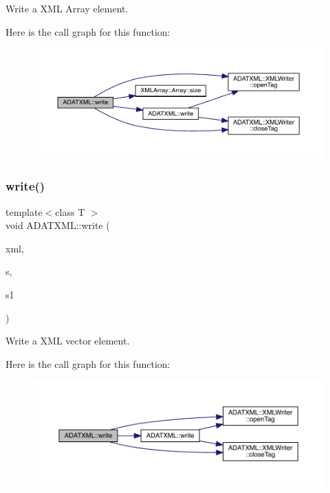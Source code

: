 Write a X\+ML Array element. 

Here is the call graph for this function\+:\nopagebreak
\begin{figure}[H]
\begin{center}
\leavevmode
\includegraphics[width=350pt]{d2/da3/group__io_ga505002df14eea0ecd6a4c92bfdc6425d_cgraph}
\end{center}
\end{figure}
\mbox{\label{group__io_gad6746caf2a4ff29e3ae8da748fd880a7}} 
\subsubsection{\texorpdfstring{write()}{write()}\hspace{0.1cm}{\footnotesize\ttfamily [16/58]}}
{\footnotesize\ttfamily template$<$class T $>$ \\
void A\+D\+A\+T\+X\+M\+L\+::write (\begin{DoxyParamCaption}\item[{\mbox{\hyperlink{classADATXML_1_1XMLWriter}{X\+M\+L\+Writer}} \&}]{xml,  }\item[{const std\+::string \&}]{s,  }\item[{const std\+::vector$<$ T $>$ \&}]{s1 }\end{DoxyParamCaption})\hspace{0.3cm}{\ttfamily [inline]}}



Write a X\+ML vector element. 

Here is the call graph for this function\+:\nopagebreak
\begin{figure}[H]
\begin{center}
\leavevmode
\includegraphics[width=350pt]{d2/da3/group__io_gad6746caf2a4ff29e3ae8da748fd880a7_cgraph}
\end{center}
\end{figure}
\mbox{\label{group__io_ga120f4c9a4f62f8190c2d87d73124fded}} 
